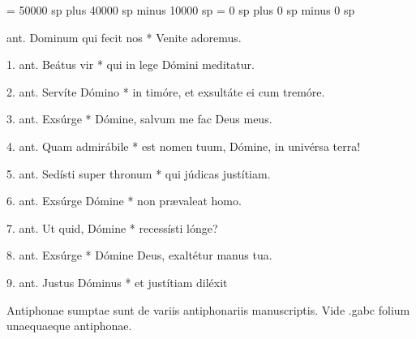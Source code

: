 



%
\spaceabovelines = 50000 sp plus 40000 sp minus 10000 sp
\spacebeneathtext = 0 sp plus 0 sp minus 0 sp

\spaceabovelines=3mm %
\spacebeneathtext=4cm %

\begin{center}

\end{center}


ant. Dominum qui fecit nos * Venite adoremus.



1. ant. Beátus vir * qui in lege Dómini meditatur.


2. ant. Servíte Dómino * in timóre, et exsultáte ei cum tremóre.


3. ant. Exsúrge * Dómine, salvum me fac Deus meus.


4. ant. Quam admirábile * est nomen tuum, Dómine, in univérsa terra!

5. ant. Sedísti super thronum * qui júdicas justítiam.
 
6. ant. Exsúrge Dómine * non prævaleat homo.



7. ant. Ut quid, Dómine * recessísti lónge?

8. ant. Exsúrge * Dómine Deus, exaltétur manus tua.

9. ant. Justus Dóminus * et justítiam diléxit


\vspace{1cm}
\small{Antiphonae sumptae sunt de variis antiphonariis manuscriptis.
Vide .gabc folium unaequaeque antiphonae.}


